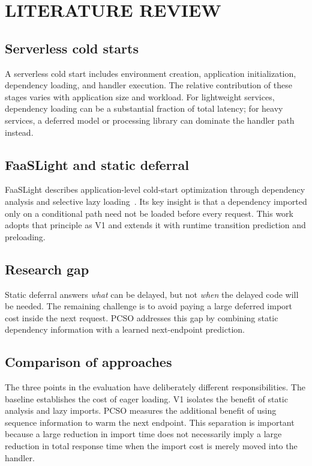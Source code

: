 \documentclass[12pt]{report}
\begin{document}
\chapter{LITERATURE REVIEW}
\section{Serverless cold starts}
A serverless cold start includes environment creation, application initialization, dependency loading, and handler execution. The relative contribution of these stages varies with application size and workload. For lightweight services, dependency loading can be a substantial fraction of total latency; for heavy services, a deferred model or processing library can dominate the handler path instead.

\section{FaaSLight and static deferral}
FaaSLight describes application-level cold-start optimization through dependency analysis and selective lazy loading~\cite{faaslight}. Its key insight is that a dependency imported only on a conditional path need not be loaded before every request. This work adopts that principle as V1 and extends it with runtime transition prediction and preloading.

\section{Research gap}
Static deferral answers \textit{what} can be delayed, but not \textit{when} the delayed code will be needed. The remaining challenge is to avoid paying a large deferred import cost inside the next request. PCSO addresses this gap by combining static dependency information with a learned next-endpoint prediction.

\section{Comparison of approaches}
The three points in the evaluation have deliberately different responsibilities. The baseline establishes the cost of eager loading. V1 isolates the benefit of static analysis and lazy imports. PCSO measures the additional benefit of using sequence information to warm the next endpoint. This separation is important because a large reduction in import time does not necessarily imply a large reduction in total response time when the import cost is merely moved into the handler.
\end{document}
